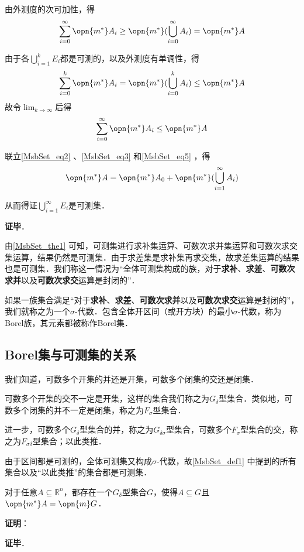 由外测度的次可加性，得
\begin{equation}\label{MsbSet_eq3}
\sum_{i=0}^\infty\opn{m^*}A_i\geq \opn{m^*}(\bigcup_{i=0}^\infty A_i)=\opn{m^*}A
\end{equation}

由于各$\bigcup_{i=1}^k E_i$都是可测的，以及外测度有单调性，得
\begin{equation}
\sum_{i=0}^k\opn{m^*}A_i=\opn{m^*}(\bigcup_{i=0}^k A_i)\leq \opn{m^*}A
\end{equation}
故令$\lim_{k\to \infty}$后得
\begin{equation}\label{MsbSet_eq5}
\sum_{i=0}^\infty\opn{m^*}A_i\leq \opn{m^*}A
\end{equation}

联立\autoref{MsbSet_eq2} 、\autoref{MsbSet_eq3} 和\autoref{MsbSet_eq5} ，得
\begin{equation}
\opn{m^*}A=\opn{m^*}A_0+\opn{m^*}(\bigcup_{i=1}^\infty A_i)
\end{equation}

从而得证$\bigcup_{i=1}^\infty E_i$是可测集．




\textbf{证毕}．


由\autoref{MsbSet_the1} 可知，可测集进行求补集运算、可数次求并集运算和可数次求交集运算，结果仍然是可测集．由于求差集是求补集再求交集，故求差集运算的结果也是可测集．我们称这一情况为“全体可测集构成的族，对于\textbf{求补}、\textbf{求差}、\textbf{可数次求并}以及\textbf{可数次求交}运算是封闭的”．

如果一族集合满足“对于\textbf{求补}、\textbf{求差}、\textbf{可数次求并}以及\textbf{可数次求交}运算是封闭的”，我们就称之为一个$\sigma$-代数．包含全体开区间（或开方块）的最小$\sigma$-代数，称为Borel族，其元素都被称作Borel集．


\subsection{Borel集与可测集的关系}

\begin{definition}{}

我们知道，可数多个开集的并还是开集，可数多个闭集的交还是闭集．

可数多个开集的交不一定是开集，这样的集合我们称之为$G_\delta$型集合\cite{十一五实变函数论}．类似地，可数多个闭集的并不一定是闭集，称之为$F_\sigma$型集合．

进一步，可数多个$G_\delta$型集合的并，称之为$G_{\delta\sigma}$型集合，可数多个$F_\sigma$型集合的交，称之为$F_{\sigma\delta}$型集合；以此类推．

\end{definition}

由于区间都是可测的，全体可测集又构成$\sigma$-代数，故\autoref{MsbSet_def1} 中提到的所有集合以及“以此类推”的集合都是可测集．

\begin{theorem}{}
对于任意$A\subseteq \mathbb{R}^n$，都存在一个$G_\delta$型集合$G$，使得$A\subseteq G$且$\opn{m^*}A=\opn{m}G$．
\end{theorem}

\textbf{证明}：



\textbf{证毕}．












